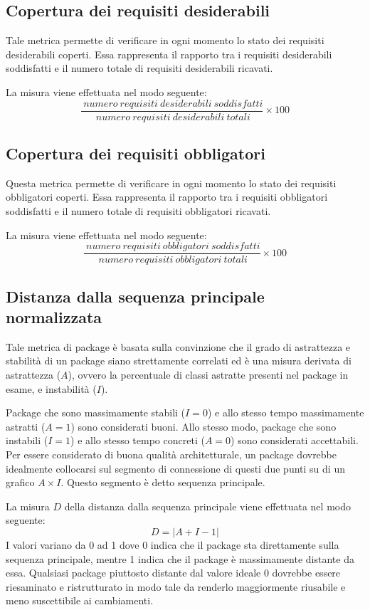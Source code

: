 \subsection{Copertura dei requisiti desiderabili}
Tale metrica permette di verificare in ogni momento lo stato dei requisiti desiderabili coperti. Essa rappresenta il rapporto tra i requisiti desiderabili soddisfatti e il numero totale di requisiti desiderabili ricavati.

La misura viene effettuata nel modo seguente:
\begin{equation}
	\frac{~numero~requisiti~desiderabili~soddisfatti}{~numero~requisiti~desiderabili~totali}\times{100}
\end{equation}

\subsection{Copertura dei requisiti obbligatori}
Questa metrica permette di verificare in ogni momento lo stato dei requisiti obbligatori coperti. Essa rappresenta il rapporto tra i requisiti obbligatori soddisfatti e il numero totale di requisiti obbligatori ricavati.

La misura viene effettuata nel modo seguente:
\begin{equation}
	\frac{~numero~requisiti~obbligatori~soddisfatti}{~numero~requisiti~obbligatori~totali}\times{100}
\end{equation}

\subsection{Distanza dalla sequenza principale normalizzata} 
Tale metrica di package è basata sulla convinzione che il grado di astrattezza e stabilità di un package siano strettamente correlati ed è una misura derivata di astrattezza ($A$), ovvero la percentuale di classi astratte presenti nel package in esame, e instabilità ($I$). 

Package che sono massimamente stabili ($I = 0$) e allo stesso tempo massimamente astratti ($A = 1$) sono considerati buoni. Allo stesso modo, package che sono instabili ($I = 1$) e allo stesso tempo concreti ($A = 0$) sono considerati accettabili. Per essere considerato di buona qualità architetturale, un package dovrebbe idealmente collocarsi sul segmento di connessione di questi due punti su di un grafico $A \times I$. Questo segmento è detto sequenza principale.

La misura $D$ della distanza dalla sequenza principale viene effettuata nel modo seguente:
\begin{equation}
	D = | A + I - 1 | 
\end{equation}
I valori variano da 0 ad 1 dove 0 indica che il package sta direttamente sulla sequenza principale, mentre 1 indica che il package è massimamente distante da essa. Qualsiasi package piuttosto distante dal valore ideale 0 dovrebbe essere riesaminato e ristrutturato in modo tale da renderlo maggiormente riusabile e meno suscettibile ai cambiamenti.

